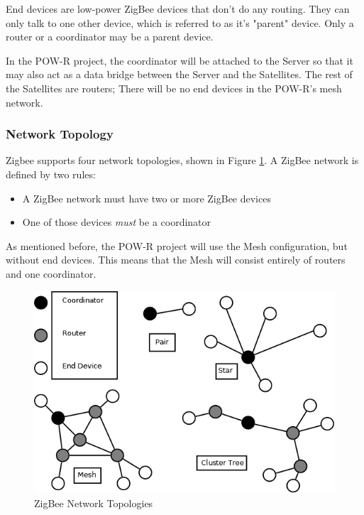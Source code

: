End devices are low-power ZigBee devices that don't do any routing. They can only talk
to one other device, which is referred to as it's "parent" device. Only a router or a coordinator
may be a parent device.

In the \ac{POW-R} project, the coordinator will be attached to the Server so that it may
also act as a data bridge between the Server and the Satellites. The rest of the 
Satellites are routers; There will be no end devices in the \ac{POW-R}'s mesh network.


\subsubsection{Network Topology}
Zigbee supports four network topologies, shown in Figure \ref{NetTopo}. A ZigBee network
is defined by two rules:

\begin{itemize}
	\item A ZigBee network must have two or more ZigBee devices
	\item One of those devices \emph{must} be a coordinator
\end{itemize}

As mentioned before, the \ac{POW-R} project will use the Mesh configuration, but without end 
devices. This means that the Mesh will consist entirely of routers and one coordinator.

\begin{figure}
\centering
\includegraphics[scale=0.3]{Hardware/images/ZigBeeNetworkTypes.png}
\caption{ZigBee Network Topologies}
\label{NetTopo}
\end{figure}